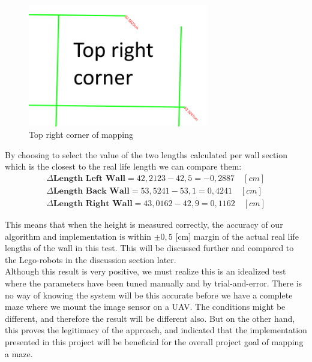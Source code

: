 \begin{figure}[H]
\centering
\includegraphics[width=0.7\textwidth]{fig/error2}
  \caption{Top right corner of mapping}
  \label{fig:error2}
\end{figure}
By choosing to select the value of the two lengths calculated per wall section which is the closest to the real life length we can compare them:
\begin{align*}
\Delta\textbf{Length Left Wall} = 42,2123-42,5 = -0,2887\quad [cm]\\
\Delta\textbf{Length Back Wall} = 53,5241-53,1 = 0,4241\quad [cm]\\
\Delta\textbf{Length Right Wall} = 43,0162-42,9 = 0,1162\quad [cm]
\end{align*}

This means that when the height is measured correctly, the accuracy of our algorithm and implementation is within $\pm 0,5$ [cm] margin of the actual real life lengths of the wall in this test. This will be discussed further and compared to the Lego-robots in the discussion section later.\\

Although this result is very positive, we must realize this is an idealized test where the parameters have been tuned manually and by trial-and-error. There is no way of knowing the system will be this accurate before we have a complete maze where we mount the image sensor on a UAV. The conditions might be different, and therefore the result will be different also. But on the other hand, this proves the legitimacy of the approach, and indicated that the implementation presented in this project will be beneficial for the overall project goal of mapping a maze.
















